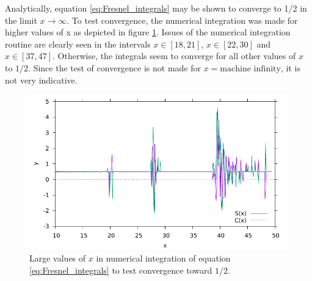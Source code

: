 \documentclass{article}
\begin{document}
	Analytically, equation \ref{eq:Fresnel_integrals} may be shown to converge to 1/2 in the limit $x\rightarrow\infty$. To test convergence, the numerical integration was made for higher values of x as depicted in figure \ref{fig:convergence}. Issues of the numerical integration routine are clearly seen in the intervals $x\in[18,21]$, $x\in[22,30]$ and $x\in[37,47]$. Otherwise, the integrals seem to converge for all other values of $x$ to $1/2$. Since the test of convergence is not made for $x = \textrm{machine infinity}$, it is not very indicative.
	\begin{figure}
	\includegraphics[]{Output2.pdf}
	\caption{Large values of $x$ in numerical integration of equation \ref{eq:Fresnel_integrals} to test convergence toward $1/2$.}
	\label{fig:convergence}
	\end{figure}	
\end{document}

